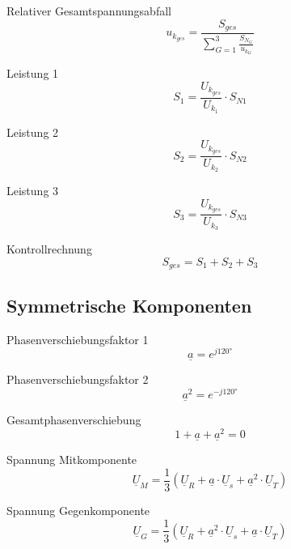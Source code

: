 \documentclass[11pt, a4paper, draft, fleqn, twocolumn]{article}
\numberwithin{equation}{subsection}
\begin{document}
\noindent Relativer Gesamtspannungsabfall
\begin{equation}
    u_{k_{ges}} = \frac{S_{ges}}{\sum_{G=1}^{3} \frac{S_{N_{G}}}{u_{k_{G}}}}
\end{equation}

\noindent Leistung 1
\begin{equation}
    S_1 = \frac{U_{k_{ges}}}{U_{k_{1}}} \cdot S_{N1}
\end{equation}

\noindent Leistung 2
\begin{equation}
    S_2 = \frac{U_{k_{ges}}}{U_{k_{2}}} \cdot S_{N2}
\end{equation}

\noindent Leistung 3
\begin{equation}
    S_3 = \frac{U_{k_{ges}}}{U_{k_{3}}} \cdot S_{N3}
\end{equation}

\noindent Kontrollrechnung
\begin{equation}
    S_{ges} = S_1 + S_2 + S_3
\end{equation}


\subsection{Symmetrische Komponenten}

Phasenverschiebungsfaktor 1
\begin{equation}
    \underline{a} = e^{j120\text{°}}
\end{equation}

\noindent Phasenverschiebungsfaktor 2
\begin{equation}
    \underline{a}^2 = e^{-j120\text{°}}
\end{equation}

\noindent Gesamtphasenverschiebung
\begin{equation}
    1 + \underline{a} + \underline{a}^2 = 0
\end{equation}

\noindent Spannung Mitkomponente
\begin{equation}
    \underline{U}_M = \frac{1}{3}(\underline{U}_R + \underline{a} \cdot \underline{U}_s + \underline{a}^2 \cdot \underline{U}_T)
\end{equation}

\noindent Spannung Gegenkomponente
\begin{equation}
    \underline{U}_G = \frac{1}{3}(\underline{U}_R + \underline{a}^2 \cdot \underline{U}_s + \underline{a} \cdot \underline{U}_T)
\end{equation}
\end{document}
